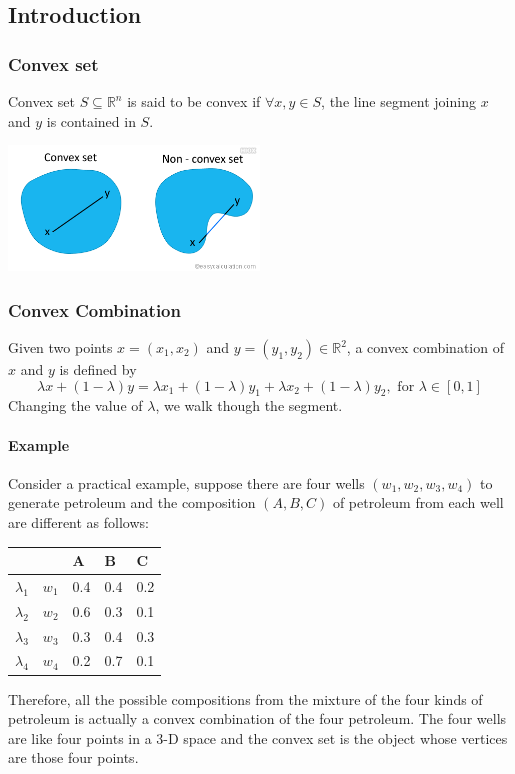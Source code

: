 \subsection{Introduction}
\subsubsection{Convex set}
Convex set $S \subseteq \mathbb{R}^n$ is said to be convex if $\forall 
x,y \in S$, the line segment joining $x$ and $y$ is contained in $S$.

\centerline{\includegraphics[width=0.5\textwidth]{convex-nonconvex-set.png}}
\subsubsection{Convex Combination}
Given two points $x=(x_1, x_2)$ and $y = (y_1, y_2) \in \mathbb{R}^2$, a convex 
combination of $x$ and $y$ is defined by
\[\lambda x + (1 - \lambda) y = \lambda x_1 + (1 - \lambda)y_1 + \lambda x_2 + 
(1 - \lambda)y_2, \text{ for } \lambda \in [0,1]\]
Changing the value of $\lambda$, we walk though the segment. 
 
 \paragraph{Example} Consider a practical example, suppose there are four wells 
$(w_1, w_2, w_3, w_4)$ to generate petroleum and the composition $(A, B, C)$ of 
petroleum from each well are different as follows:

\begin{table}[H]
\centering
\begin{tabular}{|l|l|l|l|l|}
\hline
            &       & A   & B   & C   \\ \hline
$\lambda_1$ & $w_1$ & 0.4 & 0.4 & 0.2 \\ \hline
$\lambda_2$ & $w_2$ & 0.6 & 0.3 & 0.1 \\ \hline
$\lambda_3$ & $w_3$ & 0.3 & 0.4 & 0.3 \\ \hline
$\lambda_4$ & $w_4$ & 0.2 & 0.7 & 0.1 \\ \hline
\end{tabular}
\end{table}
Therefore, all the possible compositions from the mixture of the four kinds of 
petroleum is actually a convex combination of the four petroleum. The four 
wells are like four points in a 3-D space and the convex set is the object 
whose vertices are those four points.

